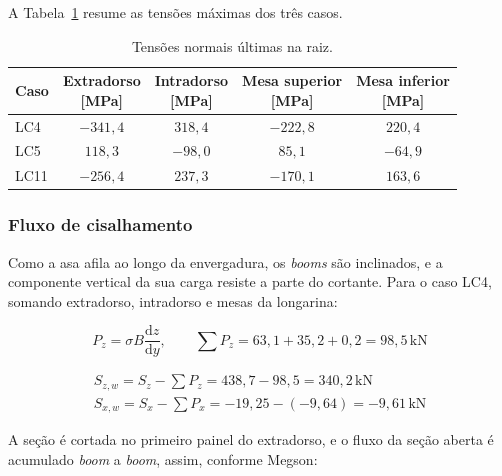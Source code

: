 A Tabela~\ref{tab:rev_tensoes_raiz} resume as tensões máximas dos três casos.
 
\begin{table}[H]
\centering
\caption{Tensões normais últimas na raiz.}
\label{tab:rev_tensoes_raiz}
\begin{tabular}{lcccc}
\toprule
\textbf{Caso} & \makecell{\textbf{Extradorso}\\\textbf{[MPa]}} & \makecell{\textbf{Intradorso}\\\textbf{[MPa]}} & \makecell{\textbf{Mesa superior}\\\textbf{[MPa]}} & \makecell{\textbf{Mesa inferior}\\\textbf{[MPa]}} \\
\midrule
LC4 & $-341{,}4$ & $318{,}4$ & $-222{,}8$ & $220{,}4$ \\
LC5 & $118{,}3$ & $-98{,}0$ & $85{,}1$ & $-64{,}9$ \\
LC11 & $-256{,}4$ & $237{,}3$ & $-170{,}1$ & $163{,}6$ \\
\bottomrule
\end{tabular}
\end{table}
 
\subsubsection{Fluxo de cisalhamento}
 
Como a asa afila ao longo da envergadura, os \textit{booms} são inclinados, e a componente vertical da sua carga resiste a parte do cortante. Para o caso LC4, somando extradorso, intradorso e mesas da longarina:
 
\begin{equation}
    P_z = \sigma B \frac{\mathrm{d}z}{\mathrm{d}y}, \qquad
    \sum P_z = 63{,}1 + 35{,}2 + 0{,}2 = 98{,}5\,\text{kN}
    \label{eq:rev_Pz}
\end{equation}
 
\begin{equation}
    \begin{gathered}
        S_{z,w} = S_z - \sum P_z = 438{,}7 - 98{,}5 = 340{,}2\,\text{kN} \\
        S_{x,w} = S_x - \sum P_x = -19{,}25 - (-9{,}64) = -9{,}61\,\text{kN}
    \end{gathered}
    \label{eq:rev_Sw}
\end{equation}
 
A seção é cortada no primeiro painel do extradorso, e o fluxo da seção aberta é acumulado \textit{boom} a \textit{boom}, assim, conforme Megson:
 
